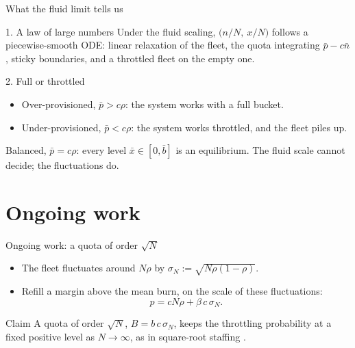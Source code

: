 \documentclass[aspectratio=169]{beamer}
\renewcommand{\cite}{\citep}
\newcommand{\sN}{\sigma_N}
\newenvironment*{myitem}[1][1.5em]{\begin{itemize}\setlength{\itemsep}{#1}}{\end{itemize}}
\begin{document}
\begin{frame}{What the fluid limit tells us}

	\begin{block}{1. A law of large numbers}
		Under the fluid scaling, $\big(n/N,\ x/N\big)$ follows a \alert{piecewise-smooth ODE}: linear relaxation of the fleet, the quota integrating $\bar p - c\bar n$, sticky boundaries, and a throttled fleet on the empty one.
	\end{block}

	\medskip

	\begin{block}{2. Full or throttled}
		\begin{itemize}
			\item Over-provisioned, $\bar p>c\rho$: the system works with a \alert{full bucket}.
			\item Under-provisioned, $\bar p<c\rho$: the system works \alert{throttled}, and the fleet piles up.
		\end{itemize}
	\end{block}

	\vfill
	{\small Balanced, $\bar p=c\rho$: every level $\bar x\in[0,\bar b]$ is an equilibrium. The fluid scale cannot decide; the fluctuations do.}
\end{frame}

\section{Ongoing work}

\begin{frame}{Ongoing work: a quota of order $\sqrt N$}

	\begin{myitem}
		\item The fleet fluctuates around $N\rho$ by $\sN := \sqrt{N\rho(1-\rho)}$.
		\item Refill a margin above the mean burn, on the scale of these fluctuations:
		\begin{equation*}
			p = cN\rho + \beta\,c\,\sN .
		\end{equation*}
	\end{myitem}

	\medskip
	\pause
	\begin{block}{Claim}
		A quota of order $\sqrt N$, $B = b\,c\,\sN$, keeps the throttling probability at a \alert{fixed positive level} as $N\to\infty$, as in square-root staffing \cite{HalfinWhitt1981}.
	\end{block}
\end{frame}
\end{document}
